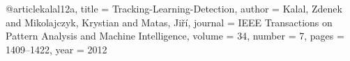 @article{kalal12a,
  title   = {{T}racking-{L}earning-{D}etection},
  author  = {Kalal, Zdenek and Mikolajczyk, Krystian and 
             Matas, Ji{\v{r}}{\'i}},
  journal = {IEEE Transactions on Pattern Analysis and 
             Machine Intelligence},
  volume  = {34},
  number  = {7},
  pages   = {1409--1422},
  year    = {2012}
}
